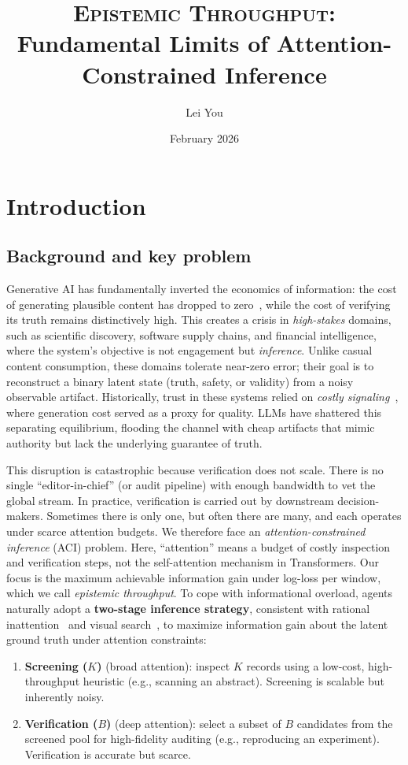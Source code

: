 \documentclass[twocolumn]{scholar7}
\title{\textsc{Epistemic Throughput}: Fundamental Limits of
Attention-Constrained Inference}
\author[1,2]{Lei You}
\affiliation[1]{Technical University of Denmark}
\affiliation[2]{CSPaper @ Scholar7}
\date{February 2026}
\begin{document}
\maketitle

\section{Introduction}
\label{sec:intro}

\subsection{Background and key problem}

Generative AI has fundamentally inverted the economics of information: the cost of generating plausible content has dropped to zero~\cite{galdin2025making}, while the cost of verifying its truth remains distinctively high.
This creates a crisis in \emph{high-stakes} domains, such as scientific discovery, software supply chains, and financial intelligence, where the system's objective is not engagement but \emph{inference}.
Unlike casual content consumption, these domains tolerate near-zero error; their goal is to reconstruct a binary latent state (truth, safety, or validity) from a noisy observable artifact.
Historically, trust in these systems relied on \emph{costly signaling}~\cite{spence1973}, where generation cost served as a proxy for quality.
LLMs have shattered this separating equilibrium, flooding the channel with cheap artifacts that mimic authority but lack the underlying guarantee of truth.


This disruption is catastrophic because verification does not scale.
There is no single ``editor-in-chief'' (or audit pipeline) with enough bandwidth to vet the global stream.
In practice, verification is carried out by downstream decision-makers. Sometimes there is only one, but often there are many, and each operates under scarce attention budgets.
We therefore face an \emph{attention-constrained inference} (ACI) problem.
Here, ``attention'' means a budget of costly inspection and verification steps, not the self-attention mechanism in Transformers.
Our focus is the maximum achievable information gain under log-loss per window, which we call \emph{epistemic throughput}.
To cope with informational overload, agents naturally adopt a \textbf{two-stage inference strategy}, consistent with rational inattention~\cite{sims2003rational} and visual search~\cite{treisman1980feature}, to maximize information gain about the latent ground truth under attention constraints:
\begin{enumerate}
\item \textbf{Screening ($K$)} (broad attention): inspect $K$ records using a low-cost, high-throughput heuristic (e.g., scanning an abstract). Screening is scalable but inherently noisy.
\item \textbf{Verification ($B$)} (deep attention): select a subset of $B$ candidates from the screened pool for high-fidelity auditing (e.g., reproducing an experiment). Verification is accurate but scarce.
\end{enumerate}
\end{document}
